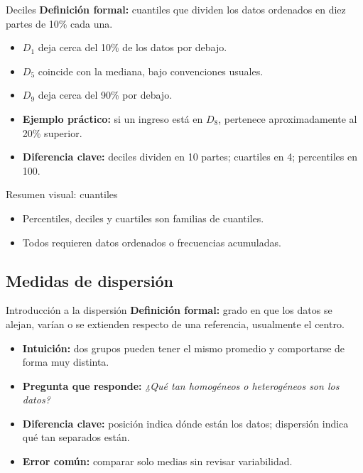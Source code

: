 \documentclass[aspectratio=169,11pt]{beamer}
\newcommand{\pregunta}[1]{\textbf{Pregunta que responde:} \emph{#1}}
\newcommand{\errorcomun}[1]{\textbf{Error común:} #1}
\newcommand{\diferencia}[1]{\textbf{Diferencia clave:} #1}
\begin{document}
\begin{frame}{Deciles}
\textbf{Definición formal:} cuantiles que dividen los datos ordenados en diez partes de 10\% cada una.
\begin{itemize}
  \item $D_1$ deja cerca del 10\% de los datos por debajo.
  \item $D_5$ coincide con la mediana, bajo convenciones usuales.
  \item $D_9$ deja cerca del 90\% por debajo.
  \item \textbf{Ejemplo práctico:} si un ingreso está en $D_8$, pertenece aproximadamente al 20\% superior.
  \item \diferencia{deciles dividen en 10 partes; cuartiles en 4; percentiles en 100.}
\end{itemize}
\end{frame}

\begin{frame}{Resumen visual: cuantiles}
\centering
{}
\vspace{0.7em}
\begin{itemize}
  \item Percentiles, deciles y cuartiles son familias de cuantiles.
  \item Todos requieren datos ordenados o frecuencias acumuladas.
\end{itemize}
\end{frame}

\subsection{Medidas de dispersión}

\begin{frame}{Introducción a la dispersión}
\textbf{Definición formal:} grado en que los datos se alejan, varían o se extienden respecto de una referencia, usualmente el centro.
\begin{itemize}
  \item \textbf{Intuición:} dos grupos pueden tener el mismo promedio y comportarse de forma muy distinta.
  \item \pregunta{¿Qué tan homogéneos o heterogéneos son los datos?}
  \item \diferencia{posición indica dónde están los datos; dispersión indica qué tan separados están.}
  \item \errorcomun{comparar solo medias sin revisar variabilidad.}
\end{itemize}
\end{frame}
\end{document}
